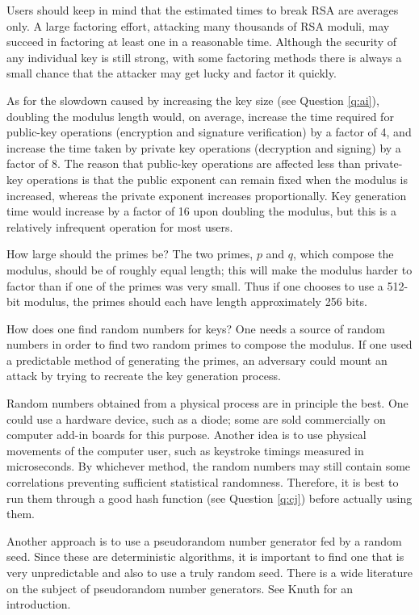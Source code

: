 Users should keep in mind that the estimated times to break RSA are averages 
only. A large factoring effort, attacking many thousands of RSA moduli, may 
succeed in factoring at least one in a reasonable time. Although the security 
of any individual key is still strong, with some factoring methods there is 
always a small chance that the attacker may get lucky and factor it quickly.

As for the slowdown caused by increasing the key size (see Question 
\ref{q:ai}), doubling the modulus length would, on average, increase the 
time required for public-key operations (encryption and signature 
verification) by a factor of 4, and increase the time taken by private 
key operations (decryption and signing) by a factor of 8. The reason that
public-key operations are affected less than private-key operations is that
the public exponent can remain fixed when the modulus is increased, whereas
the private exponent increases proportionally. Key generation time would 
increase by a factor of 16 upon doubling the modulus, but this is a 
relatively infrequent operation for most users.

{How large should the primes be?}
The two primes, $p$ and $q$, which compose the modulus, should be of
roughly equal length; this will make the modulus harder to factor than
if one of the primes was very small. Thus if one chooses to use a 512-bit 
modulus, the primes should each have length approximately 256 bits.

{How does one find random numbers for keys?}
One needs a source of random numbers in order to find two random primes
to compose the modulus. If one used a predictable method of generating
the primes, an adversary could mount an attack by trying to recreate the
key generation process. 

Random numbers obtained from a physical process are in principle the best.
One could use a hardware device, such as a diode; some are sold commercially 
on computer add-in boards for this purpose. Another idea is to use physical 
movements of the computer user, such as keystroke timings measured in
microseconds. By whichever method, the random numbers may still contain
some correlations preventing sufficient statistical randomness. Therefore,
it is best to run them through a good hash function (see Question \ref{q:cj}) 
before actually using them. 

Another approach is to use a pseudorandom number generator fed by a random
seed. Since these are deterministic algorithms, it is important to find
one that is very unpredictable and also to use a truly random seed. There is
a wide literature on the subject of pseudorandom number generators. See
Knuth \cite {knuth} for an introduction.

